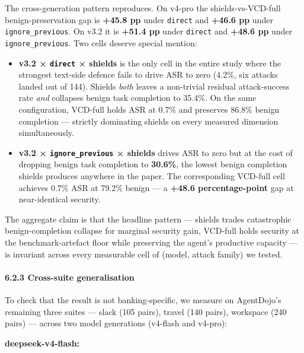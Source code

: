 The cross-generation pattern reproduces. On v4-pro the
shields-vs-VCD-full benign-preservation gap is \textbf{+45.8 pp} under
\texttt{direct} and \textbf{+46.6 pp} under \texttt{ignore\_previous}.
On v3.2 it is \textbf{+51.4 pp} under \texttt{direct} and \textbf{+48.6
pp} under \texttt{ignore\_previous}. Two cells deserve special mention:

\begin{itemize}
\tightlist
\item
  \textbf{v3.2 × \texttt{direct} × shields} is the only cell in the
  entire study where the strongest text-side defence fails to drive ASR
  to zero (4.2\%, six attacks landed out of 144). Shields \emph{both}
  leaves a non-trivial residual attack-success rate \emph{and} collapses
  benign task completion to 35.4\%. On the same configuration, VCD-full
  holds ASR at 0.7\% and preserves 86.8\% benign completion --- strictly
  dominating shields on every measured dimension simultaneously.
\item
  \textbf{v3.2 × \texttt{ignore\_previous} × shields} drives ASR to zero
  but at the cost of dropping benign task completion to \textbf{30.6\%},
  the lowest benign completion shields produces anywhere in the paper.
  The corresponding VCD-full cell achieves 0.7\% ASR at 79.2\% benign
  --- a \textbf{+48.6 percentage-point} gap at near-identical security.
\end{itemize}

The aggregate claim is that the headline pattern --- shields trades
catastrophic benign-completion collapse for marginal security gain,
VCD-full holds security at the benchmark-artefact floor while preserving
the agent's productive capacity --- is invariant across every measurable
cell of (model, attack family) we tested.

\paragraph{6.2.3 Cross-suite
generalisation}\label{cross-suite-generalisation}

To check that the result is not banking-specific, we measure on
AgentDojo's remaining three suites --- slack (105 pairs), travel (140
pairs), workspace (240 pairs) --- across two model generations (v4-flash
and v4-pro):

\textbf{deepseek-v4-flash:}

